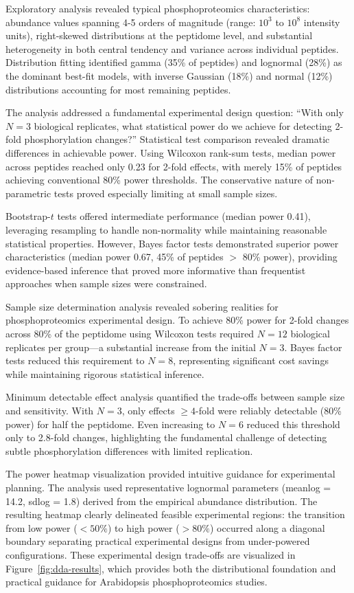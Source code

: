 Exploratory analysis revealed typical phosphoproteomics characteristics: abundance values spanning 4-5 orders of magnitude (range: $10^3$ to $10^8$ intensity units), right-skewed distributions at the peptidome level, and substantial heterogeneity in both central tendency and variance across individual peptides. Distribution fitting identified gamma (35\% of peptides) and lognormal (28\%) as the dominant best-fit models, with inverse Gaussian (18\%) and normal (12\%) distributions accounting for most remaining peptides.

The analysis addressed a fundamental experimental design question: ``With only $N=3$ biological replicates, what statistical power do we achieve for detecting 2-fold phosphorylation changes?'' Statistical test comparison revealed dramatic differences in achievable power. Using Wilcoxon rank-sum tests, median power across peptides reached only 0.23 for 2-fold effects, with merely 15\% of peptides achieving conventional 80\% power thresholds. The conservative nature of non-parametric tests proved especially limiting at small sample sizes.

Bootstrap-$t$ tests offered intermediate performance (median power 0.41), leveraging resampling to handle non-normality while maintaining reasonable statistical properties. However, Bayes factor tests demonstrated superior power characteristics (median power 0.67, 45\% of peptides $>$ 80\% power), providing evidence-based inference that proved more informative than frequentist approaches when sample sizes were constrained.

Sample size determination analysis revealed sobering realities for phosphoproteomics experimental design. To achieve 80\% power for 2-fold changes across 80\% of the peptidome using Wilcoxon tests required $N=12$ biological replicates per group---a substantial increase from the initial $N=3$. Bayes factor tests reduced this requirement to $N=8$, representing significant cost savings while maintaining rigorous statistical inference.

Minimum detectable effect analysis quantified the trade-offs between sample size and sensitivity. With $N=3$, only effects $\geq 4$-fold were reliably detectable (80\% power) for half the peptidome. Even increasing to $N=6$ reduced this threshold only to 2.8-fold changes, highlighting the fundamental challenge of detecting subtle phosphorylation differences with limited replication.

The power heatmap visualization provided intuitive guidance for experimental planning. The analysis used representative lognormal parameters (meanlog = 14.2, sdlog = 1.8) derived from the empirical abundance distribution. The resulting heatmap clearly delineated feasible experimental regions: the transition from low power ($< 50\%$) to high power ($> 80\%$) occurred along a diagonal boundary separating practical experimental designs from under-powered configurations. These experimental design trade-offs are visualized in Figure~\ref{fig:dda-results}, which provides both the distributional foundation and practical guidance for Arabidopsis phosphoproteomics studies.

